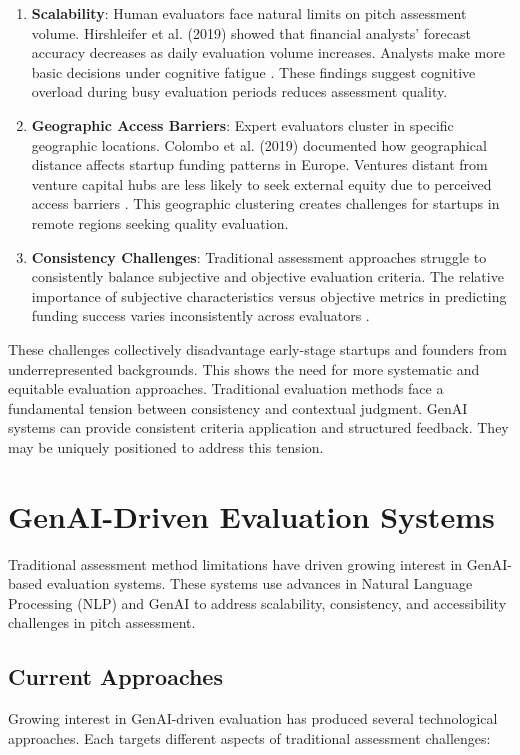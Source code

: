 \begin{enumerate}
    \item \textbf{Scalability}: Human evaluators face natural limits on pitch assessment volume. Hirshleifer et al. (2019) showed that financial analysts' forecast accuracy decreases as daily evaluation volume increases. Analysts make more basic decisions under cognitive fatigue \cite{Hirshleifer2019}. These findings suggest cognitive overload during busy evaluation periods reduces assessment quality.

    \item \textbf{Geographic Access Barriers}: Expert evaluators cluster in specific geographic locations. Colombo et al. (2019) documented how geographical distance affects startup funding patterns in Europe. Ventures distant from venture capital hubs are less likely to seek external equity due to perceived access barriers \cite{Colombo2019}. This geographic clustering creates challenges for startups in remote regions seeking quality evaluation.

    \item \textbf{Consistency Challenges}: Traditional assessment approaches struggle to consistently balance subjective and objective evaluation criteria. The relative importance of subjective characteristics versus objective metrics in predicting funding success varies inconsistently across evaluators \cite{Tsay2021VISUALSDI}.
\end{enumerate}

These challenges collectively disadvantage early-stage startups and founders from underrepresented backgrounds. This shows the need for more systematic and equitable evaluation approaches. Traditional evaluation methods face a fundamental tension between consistency and contextual judgment. GenAI systems can provide consistent criteria application and structured feedback. They may be uniquely positioned to address this tension.

\section{GenAI-Driven Evaluation Systems}
\label{sec:ai-systems}

Traditional assessment method limitations have driven growing interest in GenAI-based evaluation systems. These systems use advances in Natural Language Processing (NLP) and GenAI to address scalability, consistency, and accessibility challenges in pitch assessment.

\subsection{Current Approaches}\label{subsec:current-approaches}
Growing interest in GenAI-driven evaluation has produced several technological approaches. Each targets different aspects of traditional assessment challenges:

